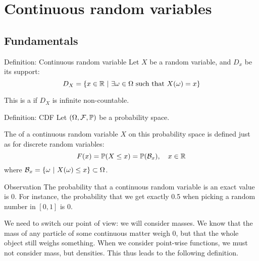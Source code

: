 \documentclass[a4paper]{article}
\begin{document}
\section{Continuous random variables}
\subsection{Fundamentals}

\begin{parag}{Definition: Continuous random variable}
    Let $X$ be a random variable, and $D_x$ be its support: 
    \[D_X = \left\{x \in \mathbb{R} \suchthat \exists \omega \in \Omega \text{ such that } X\left(\omega\right) = x\right\}\]
    
    This is a  if $D_X$ is infinite non-countable.
\end{parag}


\begin{parag}{Definition: CDF}
    Let $\left(\Omega, \mathcal{F}, \prob\right)$ be a probability space.

    The  of a continuous random variable $X$ on this probability space is defined just as for discrete random variables: 
    \[F\left(x\right) = \prob\left(X \leq x\right) = \prob\left(\mathcal{B}_x\right), \mathspace x \in \mathbb{R}\]
    where $\mathcal{B}_x = \left\{\omega \suchthat X\left(\omega\right) \leq x\right\} \subset \Omega$.
\end{parag}

\begin{parag}{Observation}
    The probability that a continuous random variable is an exact value is 0. For instance, the probability that we get exactly 0.5 when picking a random number in $\left[0, 1\right]$ is 0.

    We need to switch our point of view: we will consider masses. We know that the mass of any particle of some continuous matter weigh 0, but that the whole object still weighs something. When we consider point-wise functions, we must not consider mass, but densities. This thus leads to the following definition.
\end{parag}
\end{document}
